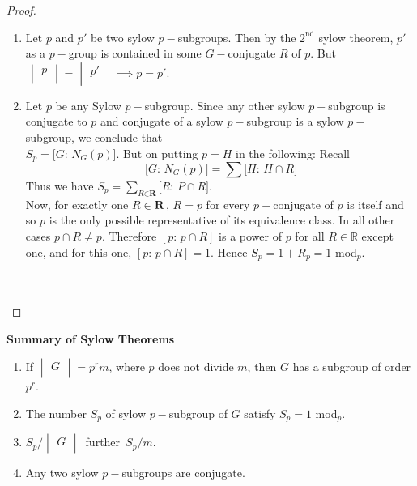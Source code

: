 \documentclass[11pt,a4paper]{article}
\theoremstyle{definition}
\begin{document}
\begin{proof}
\begin{enumerate}
\item[(i)] Let $p$ and $p'$ be two sylow $p-$subgroups. Then by the $2^{\text{nd}}$ sylow theorem, $p'$ as a $p-$group is contained in some $G-$conjugate $R$ of $p$. But $\, \begin{vmatrix}
p\\
\end{vmatrix} = \begin{vmatrix}
p'\\
\end{vmatrix} \implies p = p'$.

\item Let $p$ be any Sylow $p-$subgroup. Since any other sylow $p-$subgroup is conjugate to $p$ and conjugate of  a sylow $p-$subgroup is a sylow $p-$subgroup, we conclude that\\ $S_p = \big[G:\, N_G(p)\big]$. But on putting $p=H$ in the following: Recall $$\, \big[G:\, N_G(p)\big] = \sum \big[H:\, H\cap R\big]$$
 Thus we have $S_p = \sum\limits_{\textit{R}\in \textbf{R}}\big[R:\, P\cap R\big]$.\\
Now, for exactly one $R\in \textbf{R}\, , \, R=p$ for every $p-$conjugate of $p$ is  itself and so $p$ is the only possible representative of its equivalence class. In all other cases $p\cap R\neq p$. Therefore $[p:\, p\cap R]$ is a power of $p$ for all $R\in \mathbb{R}$ except one, and for this one, $[p:\, p\cap R] = 1$. Hence $S_p = 1 + R_p = 1$ mod$_p$.\\\\\\
\end{enumerate}
\end{proof}






\textbf{Summary of Sylow Theorems}
\begin{enumerate}
\item[•] If $\begin{vmatrix}
G\\
\end{vmatrix} = p^rm$, where $p$ does not divide $m$, then $G$ has a subgroup of order $p^r$.
\item[•] The number $S_p$ of sylow $p-$subgroup of $G$ satisfy $S_p = 1$ mod$_p$.
\item[•] $S_p\big/\begin{vmatrix}
G\\
\end{vmatrix}\,$ further $\, S_p\big/m$.
\item[•] Any two sylow $p-$subgroups are conjugate.\\\\\\
\end{enumerate}
\end{document}
